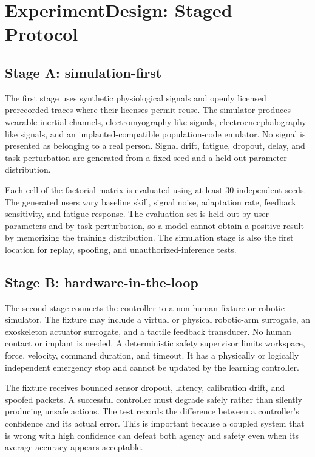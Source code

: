 \documentclass[conference]{IEEEtran}
\begin{document}
\section{ExperimentDesign: Staged Protocol}

\subsection{Stage A: simulation-first}

The first stage uses synthetic physiological signals and openly licensed prerecorded traces where their licenses permit reuse. The simulator produces wearable inertial channels, electromyography-like signals, electroencephalography-like signals, and an implanted-compatible population-code emulator. No signal is presented as belonging to a real person. Signal drift, fatigue, dropout, delay, and task perturbation are generated from a fixed seed and a held-out parameter distribution.

Each cell of the factorial matrix is evaluated using at least 30 independent seeds. The generated users vary baseline skill, signal noise, adaptation rate, feedback sensitivity, and fatigue response. The evaluation set is held out by user parameters and by task perturbation, so a model cannot obtain a positive result by memorizing the training distribution. The simulation stage is also the first location for replay, spoofing, and unauthorized-inference tests.

\subsection{Stage B: hardware-in-the-loop}

The second stage connects the controller to a non-human fixture or robotic simulator. The fixture may include a virtual or physical robotic-arm surrogate, an exoskeleton actuator surrogate, and a tactile feedback transducer. No human contact or implant is needed. A deterministic safety supervisor limits workspace, force, velocity, command duration, and timeout. It has a physically or logically independent emergency stop and cannot be updated by the learning controller.

The fixture receives bounded sensor dropout, latency, calibration drift, and spoofed packets. A successful controller must degrade safely rather than silently producing unsafe actions. The test records the difference between a controller's confidence and its actual error. This is important because a coupled system that is wrong with high confidence can defeat both agency and safety even when its average accuracy appears acceptable.
\end{document}
